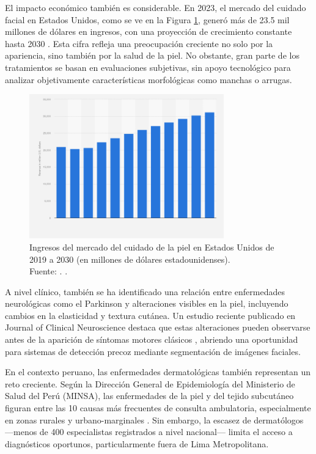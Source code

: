El impacto económico también es considerable. En 2023, el mercado del cuidado facial en Estados Unidos, como se ve en la Figura \ref{1:fig3}, generó más de 23.5 mil millones de dólares en ingresos, con una proyección de crecimiento constante hasta 2030 \parencite{statista2025usforecast}. Esta cifra refleja una preocupación creciente no solo por la apariencia, sino también por la salud de la piel. No obstante, gran parte de los tratamientos se basan en evaluaciones subjetivas, sin apoyo tecnológico para analizar objetivamente características morfológicas como manchas o arrugas.
\begin{figure}[H]
	\begin{center}
		\includegraphics[width=0.75\textwidth]{1/figures/cap1usa.png}
		\caption[Ingresos del mercado del cuidado de la piel en Estados Unidos de 2019 a 2030 (en millones de dólares estadounidenses)]{Ingresos del mercado del cuidado de la piel en Estados Unidos de 2019 a 2030 (en millones de dólares estadounidenses).\\
			Fuente: \cite{statista2023us}. .}
		\label{1:fig3}
	\end{center}
\end{figure}

A nivel clínico, también se ha identificado una relación entre enfermedades neurológicas como el Parkinson y alteraciones visibles en la piel, incluyendo cambios en la elasticidad y textura cutánea. Un estudio reciente publicado en Journal of Clinical Neuroscience destaca que estas alteraciones pueden observarse antes de la aparición de síntomas motores clásicos \parencite{pan2021cutaneous}, abriendo una oportunidad para sistemas de detección precoz mediante segmentación de imágenes faciales.

En el contexto peruano, las enfermedades dermatológicas también representan un reto creciente. Según la Dirección General de Epidemiología del Ministerio de Salud del Perú (MINSA), las enfermedades de la piel y del tejido subcutáneo figuran entre las 10 causas más frecuentes de consulta ambulatoria, especialmente en zonas rurales y urbano-marginales \parencite{minsa2022}. Sin embargo, la escasez de dermatólogos —menos de 400 especialistas registrados a nivel nacional— limita el acceso a diagnósticos oportunos, particularmente fuera de Lima Metropolitana.

